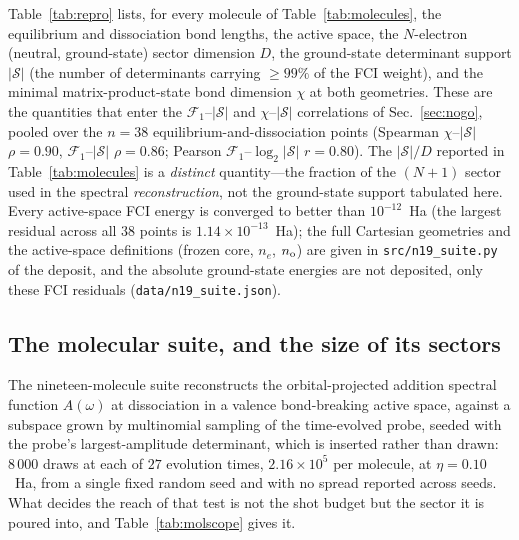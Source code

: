 Table~\ref{tab:repro} lists, for every molecule of Table~\ref{tab:molecules}, the equilibrium and
dissociation bond lengths, the active space, the $N$-electron (neutral, ground-state) sector dimension $D$, the ground-state
determinant support $|\mathcal S|$ (the number of determinants carrying $\ge99\%$ of the FCI weight), and
the minimal matrix-product-state bond dimension $\chi$ at both geometries. These are the quantities that
enter the $\mathcal F_1$--$|\mathcal S|$ and $\chi$--$|\mathcal S|$ correlations of
Sec.~\ref{sec:nogo}, pooled over the $n=38$ equilibrium-and-dissociation points (Spearman
$\chi$--$|\mathcal S|$ $\rho=0.90$, $\mathcal F_1$--$|\mathcal S|$ $\rho=0.86$; Pearson
$\mathcal F_1$--$\log_2|\mathcal S|$ $r=0.80$). The $|\mathcal S|/D$ reported in
Table~\ref{tab:molecules} is a \emph{distinct} quantity---the fraction of the $(N{+}1)$ sector used in
the spectral \emph{reconstruction}, not the ground-state support tabulated here. Every active-space FCI
energy is converged to better than $10^{-12}$~Ha (the largest residual across all $38$ points is
$1.14\times10^{-13}$~Ha); the full Cartesian geometries and the active-space definitions (frozen core,
$n_e$, $n_{\rm o}$) are given in \texttt{src/n19\_suite.py} of the deposit, and the absolute ground-state
energies are not deposited, only these FCI residuals (\texttt{data/n19\_suite.json}).

\subsection{The molecular suite, and the size of its sectors}
\label{sec:scope:mol}




The nineteen-molecule suite reconstructs the orbital-projected addition spectral function $A(\omega)$
at dissociation in a valence bond-breaking active space, against a subspace grown by multinomial
sampling of the time-evolved probe, seeded with the probe's largest-amplitude determinant, which is
inserted rather than drawn: $8\,000$ draws at each of $27$ evolution times,
$2.16\times10^{5}$ per molecule, at $\eta=0.10$~Ha, from a single fixed random seed and with no spread
reported across seeds. What decides the reach of that test is not the shot budget but the sector it is
poured into, and Table~\ref{tab:molscope} gives it.

